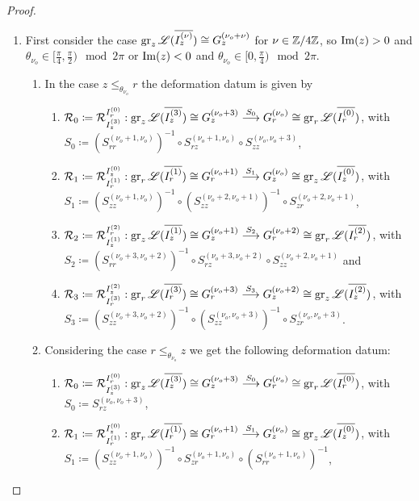 \begin{proof}
\begin{enumerate}
    \item First consider the case $\operatorname{gr}_z\mathscr{L}(\overline{I_z^{(\nu)}}) \cong G^{(\nu_o +\nu)}_z$ for $\nu \in \mathbb{Z}/4\mathbb{Z}$, so $\operatorname{Im}(z) > 0$ and $\theta_{\nu_o} \in [\frac{\pi}{4},\frac{\pi}{2}) \mod 2\pi$ or $\operatorname{Im}(z) <0$ and $\theta_{\nu_o} \in [0,\frac{\pi}{4}) \mod 2\pi$.
    \begin{enumerate}
        \item In the case $z \leq_{\theta_{\nu_o}} r$ the deformation datum is given by
    \begin{enumerate}
        \item $\mathcal{R}_0 \coloneqq \mathcal{R}_{I_z^{(3)}}^{I_r^{(0)}}: \operatorname{gr}_z\mathscr{L}(\overline{I_z^{(3)}}) \cong G_z^{(\nu_o + 3)} \overset{S_0}{\longrightarrow} G_r^{(\nu_o)} \cong \operatorname{gr}_r\mathscr{L}(\overline{I_r^{(0)}})$, with $S_0 \coloneqq (S_{rr}^{(\nu_o+1,\nu_o)})^{-1} \circ S_{rz}^{(\nu_o+1,\nu_o)}\circ S_{zz}^{(\nu_o,\nu_o+3)}$, 
        \item $\mathcal{R}_1 \coloneqq \mathcal{R}_{I_r^{(1)}}^{I_z^{(0)}}: \operatorname{gr}_r\mathscr{L}(\overline{I_r^{(1)}}) \cong G_r^{(\nu_o+1)} \overset{S_1}{\longrightarrow} G_z^{(\nu_o)} \cong \operatorname{gr}_z\mathscr{L}(\overline{I_z^{(0)}})$, with $S_1 \coloneqq (S_{zz}^{(\nu_o+1,\nu_o)})^{-1}\circ (S_{zz}^{(\nu_o+2,\nu_o+1)})^{-1} \circ S_{zr}^{(\nu_o+2,\nu_o+1)}$,
        \item $\mathcal{R}_2 \coloneqq \mathcal{R}_{I_z^{(1)}}^{I_r^{(2)}}: \operatorname{gr}_z\mathscr{L}(\overline{I_z^{(1)}}) \cong G_z^{(\nu_o+1)} \overset{S_2}{\longrightarrow} G_r^{(\nu_o+2)} \cong \operatorname{gr}_r\mathscr{L}(\overline{I_r^{(2)}})$, with $S_2 \coloneqq (S_{rr}^{(\nu_o+3,\nu_o+2)})^{-1} \circ S_{rz}^{(\nu_o+3,\nu_o+2)}\circ S_{zz}^{(\nu_o+2,\nu_o+1)}$ and 
        \item $\mathcal{R}_3 \coloneqq \mathcal{R}_{I_r^{(3)}}^{I_z^{(2)}}: \operatorname{gr}_r\mathscr{L}(\overline{I_r^{(3)}}) \cong G_r^{(\nu_o+3)} \overset{S_3}{\longrightarrow} G_z^{(\nu_o+2)} \cong \operatorname{gr}_z\mathscr{L}(\overline{I_z^{(2)}})$, with $S_3 \coloneqq (S_{zz}^{(\nu_o+3,\nu_o+2)})^{-1}\circ (S_{zz}^{(\nu_o,\nu_o+3)})^{-1} \circ S_{zr}^{(\nu_o,\nu_o+3)}$.
\end{enumerate}
\item Considering the case $r \leq_{\theta_{\nu_o}} z$ we get the following deformation datum:
\begin{enumerate}
        \item $\mathcal{R}_0 \coloneqq \mathcal{R}_{I_z^{(3)}}^{I_r^{(0)}}: \operatorname{gr}_z\mathscr{L}(\overline{I_z^{(3)}}) \cong G_z^{(\nu_o + 3)} \overset{S_0}{\longrightarrow} G_r^{(\nu_o)} \cong \operatorname{gr}_r\mathscr{L}(\overline{I_r^{(0)}})$, with $S_0 \coloneqq S_{rz}^{(\nu_o,\nu_o+3)}$, 
        \item $\mathcal{R}_1 \coloneqq \mathcal{R}_{I_r^{(1)}}^{I_z^{(0)}}: \operatorname{gr}_r\mathscr{L}(\overline{I_r^{(1)}}) \cong G_r^{(\nu_o+1)} \overset{S_1}{\longrightarrow} G_z^{(\nu_o)} \cong \operatorname{gr}_z\mathscr{L}(\overline{I_z^{(0)}})$, with $S_1 \coloneqq (S_{zz}^{(\nu_o+1,\nu_o)})^{-1}\circ S_{zr}^{(\nu_o+1,\nu_o)} \circ (S_{rr}^{(\nu_o+1,\nu_o)})^{-1}$,

\end{enumerate}
\end{enumerate}
\end{enumerate}
\end{proof}
